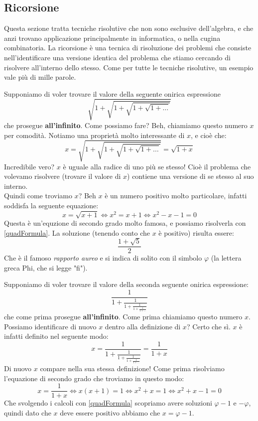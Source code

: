 \documentclass[11pt]{scrartcl}
\begin{document}
	\subsection{Ricorsione}
	Questa sezione tratta tecniche risolutive che non sono esclusive dell'algebra, e che anzi trovano applicazione principalmente in informatica, o nella cugina combinatoria.
	La ricorsione è una tecnica di risoluzione dei problemi che consiste nell'identificare una versione identica del problema che stiamo cercando di risolvere all'interno dello stesso. Come per tutte le tecniche risolutive, un esempio vale più di mille parole.
	\begin{example}
		Supponiamo di voler trovare il valore della seguente onirica espressione
		$$\sqrt{1+\sqrt{1+\sqrt{1+\sqrt{1+\dots}}}}$$
		che prosegue \textbf{all'infinito}. Come possiamo fare? Beh, chiamiamo questo numero $x$ per comodità. Notiamo una proprietà molto interessante di $x$, e cioè che:
		$$x=\sqrt{1+\sqrt{1+\sqrt{1+\sqrt{1+\dots}}}}=\sqrt{1+x}$$
		Incredibile vero? $x$ è uguale alla radice di uno più se stesso! Cioè il problema che volevamo risolvere (trovare il valore di $x$) contiene una versione di se stesso al suo interno.\\
		Quindi come troviamo $x$? Beh $x$ è un numero positivo molto particolare, infatti soddisfa la seguente equazione:
		$$x=\sqrt{x+1} \iff x^2=x+1 \iff x^2-x-1=0$$
		Questa è un'equzione di secondo grado molto famosa, e possiamo risolverla con \ref{quadFormula}. La soluzione (tenendo conto che $x$ è positivo) risulta essere:
		$$\frac{1+\sqrt{5}}{2}$$
		Che è il famoso \emph{rapporto aureo} e si indica di solito con il simbolo $\varphi$ (la lettera greca Phi, che si legge "fi").
	\end{example}
	\begin{example}
		Supponiamo di voler trovare il valore della seconda seguente onirica espressione:
		$$\frac{1}{1+\frac{1}{1+\frac{1}{1+\frac{1}{1+\dots}}}}$$
		che come prima prosegue \textbf{all'infinito}. Come prima chiamiamo questo numero $x$. Possiamo identificare di nuovo $x$ dentro alla definizione di $x$? Certo che sì. $x$ è infatti definito nel seguente modo:
		$$x=\frac{1}{1+\frac{1}{1+\frac{1}{1+\frac{1}{1+\dots}}}}=\frac{1}{1+x}$$
		Di nuovo $x$ compare nella sua stessa definizione! Come prima risolviamo l'equazione di secondo grado che troviamo in questo modo:
		$$x=\frac{1}{1+x}\iff x(x+1)=1 \iff x^2+x=1 \iff x^2+x-1=0$$
		Che svolgendo i calcoli con \ref{quadFormula} scopriamo avere soluzioni $\varphi-1$ e $-\varphi$, quindi dato che $x$ deve essere positivo abbiamo che $x=\varphi-1$.
	\end{example}
	\newpage
\end{document}
